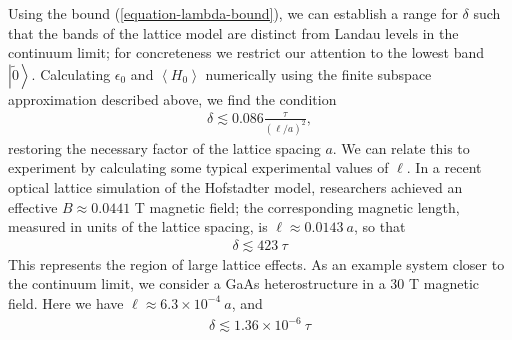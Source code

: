 \documentclass[aps,prb,twocolumn,letterpaper,twoside,nobalancelastpage,groupedaddress,amsmath,amssymb,floatfix,citeautoscript]{revtex4-1}
\begin{document}
Using the bound (\ref{equation-lambda-bound}), we can establish a range for $\delta$ such that the bands of the lattice model are distinct from Landau levels in the continuum limit; for concreteness we restrict our attention to the lowest band $\left|\tilde{0}\right>$. Calculating $\epsilon_0$ and $\left<H_0\right>$ numerically using the finite subspace approximation described above, we find the condition
\begin{align*}
\delta \lesssim 0.086 \frac{\tau}{(\ell/a)^2},
\end{align*}
restoring the necessary factor of the lattice spacing $a$. We can relate this to experiment by calculating some typical experimental values of $\ell$.  
In a recent optical lattice simulation of the Hofstadter model, researchers achieved an effective $B\approx0.0441$ T magnetic field; the corresponding magnetic length, measured in units of the lattice spacing, is $\ell\approx0.0143 ~a$, so that 
\begin{align*}
\delta \lesssim 423~ \tau
\end{align*}
This represents the region of large lattice effects. As an example system closer to the continuum limit, we consider a GaAs heterostructure in a 30 T magnetic field. Here we have $\ell \approx 6.3\times10^{-4}~ a$, and
\begin{align*}
\delta \lesssim 1.36\times10^{-6}~ \tau
\end{align*}


\end{document}
